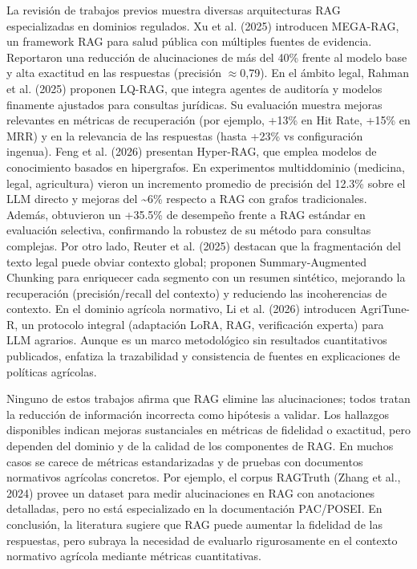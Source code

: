 La revisión de trabajos previos muestra diversas arquitecturas RAG especializadas en dominios regulados. Xu et al. (2025) introducen MEGA-RAG, un framework RAG para salud pública con múltiples fuentes de evidencia. Reportaron una reducción de alucinaciones de más del 40\% frente al modelo base y alta exactitud en las respuestas (precisión $\approx$0,79). En el ámbito legal, Rahman et al. (2025) proponen LQ-RAG, que integra agentes de auditoría y modelos finamente ajustados para consultas jurídicas. Su evaluación muestra mejoras relevantes en métricas de recuperación (por ejemplo, +13\% en Hit Rate, +15\% en MRR) y en la relevancia de las respuestas (hasta +23\% vs configuración ingenua). Feng et al. (2026) presentan Hyper-RAG, que emplea modelos de conocimiento basados en hipergrafos. En experimentos multiddominio (medicina, legal, agricultura) vieron un incremento promedio de precisión del 12.3\% sobre el LLM directo y mejoras del \textasciitilde{}6\% respecto a RAG con grafos tradicionales. Además, obtuvieron un +35.5\% de desempeño frente a RAG estándar en evaluación selectiva, confirmando la robustez de su método para consultas complejas. Por otro lado, Reuter et al. (2025) destacan que la fragmentación del texto legal puede obviar contexto global; proponen Summary-Augmented Chunking para enriquecer cada segmento con un resumen sintético, mejorando la recuperación (precisión/recall del contexto) y reduciendo las incoherencias de contexto. En el dominio agrícola normativo, Li et al. (2026) introducen AgriTune-R, un protocolo integral (adaptación LoRA, RAG, verificación experta) para LLM agrarios. Aunque es un marco metodológico sin resultados cuantitativos publicados, enfatiza la trazabilidad y consistencia de fuentes en explicaciones de políticas agrícolas.

Ninguno de estos trabajos afirma que RAG elimine las alucinaciones; todos tratan la reducción de información incorrecta como hipótesis a validar. Los hallazgos disponibles indican mejoras sustanciales en métricas de fidelidad o exactitud, pero dependen del dominio y de la calidad de los componentes de RAG. En muchos casos se carece de métricas estandarizadas y de pruebas con documentos normativos agrícolas concretos. Por ejemplo, el corpus RAGTruth (Zhang et al., 2024) provee un dataset para medir alucinaciones en RAG con anotaciones detalladas, pero no está especializado en la documentación PAC/POSEI. En conclusión, la literatura sugiere que RAG puede aumentar la fidelidad de las respuestas, pero subraya la necesidad de evaluarlo rigurosamente en el contexto normativo agrícola mediante métricas cuantitativas.


